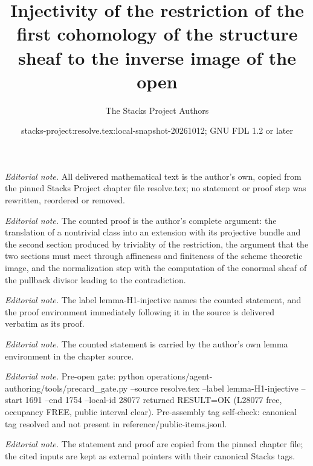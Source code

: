 \documentclass[10pt,a4paper]{amsart}
\title{Injectivity of the restriction of the first cohomology of the structure sheaf to the inverse image of the open}
\author{The Stacks Project Authors}
\date{stacks-project:resolve.tex:local-snapshot-20261012; GNU FDL 1.2 or later}
\theoremstyle{plain}
\theoremstyle{definition}
\theoremstyle{remark}
\numberwithin{equation}{subsection}
\begin{document}
\maketitle
\noindent\textit{Editorial note.} All delivered mathematical text is the author's own, copied from the pinned Stacks Project chapter file resolve.tex; no statement or proof step was rewritten, reordered or removed.\par\medskip
\noindent\textit{Editorial note.} The counted proof is the author's complete argument: the translation of a nontrivial class into an extension with its projective bundle and the second section produced by triviality of the restriction, the argument that the two sections must meet through affineness and finiteness of the scheme theoretic image, and the normalization step with the computation of the conormal sheaf of the pullback divisor leading to the contradiction.\par\medskip
\noindent\textit{Editorial note.} The label lemma-H1-injective names the counted statement, and the proof environment immediately following it in the source is delivered verbatim as its proof.\par\medskip
\noindent\textit{Editorial note.} The counted statement is carried by the author's own lemma environment in the chapter source.\par\medskip
\noindent\textit{Editorial note.} Pre-open gate: python operations/agent-authoring/tools/precard\_gate.py --source resolve.tex --label lemma-H1-injective --start 1691 --end 1754 --local-id 28077 returned RESULT=OK (L28077 free, occupancy FREE, public interval clear). Pre-assembly tag self-check: canonical tag resolved and not present in reference/public-items.jsonl.\par\medskip
\noindent\textit{Editorial note.} The statement and proof are copied from the pinned chapter file; the cited inputs are kept as external pointers with their canonical Stacks tags.\par\medskip
\end{document}
